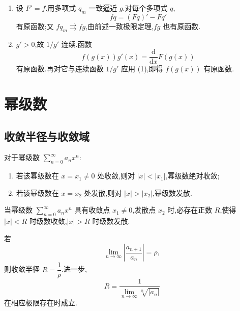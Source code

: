 \begin{solution}
    \leavevmode
    \begin{enumerate}
        \item 设 $F'=f$.用多项式 $q_m$ 一致逼近 $g$.对每个多项式 $q$,
              \[
                  fq=(Fq)'-Fq'
              \]
              有原函数;又 $fq_m\rightrightarrows fg$,由前述一致极限定理,$fg$ 也有原函数.
        \item $g'>0$,故 $1/g'$ 连续.函数
              \[
                  f(g(x))g'(x)=\dfrac{\mathrm{d}}{\mathrm{d}x}F(g(x))
              \]
              有原函数.再对它与连续函数 $1/g'$ 应用 (1),即得 $f(g(x))$ 有原函数.
    \end{enumerate}
\end{solution}


\newpage

\section{幂级数}


\subsection{收敛半径与收敛域}

\begin{theorem}[\markstar]
    对于幂级数 $\displaystyle\sum\limits_{n=0}^{\infty}a_nx^n$:
    \begin{enumerate}
        \item 若该幂级数在 $x=x_1\neq0$ 处收敛,则对 $|x|<|x_1|$,幂级数绝对收敛;
        \item 若该幂级数在 $x=x_2$ 处发散,则对 $|x|>|x_2|$,幂级数发散.
    \end{enumerate}
\end{theorem}

\begin{corollary}[\markstar]
    当幂级数 $\displaystyle\sum\limits_{n=0}^{\infty}a_nx^n$ 具有收敛点 $x_1\neq0$,发散点 $x_2$ 时,必存在正数 $R$,使得 $|x|<R$ 时级数收敛,$|x|>R$ 时级数发散.
\end{corollary}

\begin{theorem}[\markstar]
    若
    \[
        \displaystyle\lim\limits_{n\to\infty}\left|\dfrac{a_{n+1}}{a_n}\right|=\rho,
    \]
    则收敛半径 $R=\dfrac{1}{\rho}$.进一步,
    \[
        R=\dfrac{1}{\displaystyle\lim\limits_{n\to\infty}\sqrt[n]{|a_n|}}
    \]
    在相应极限存在时成立.
\end{theorem}

